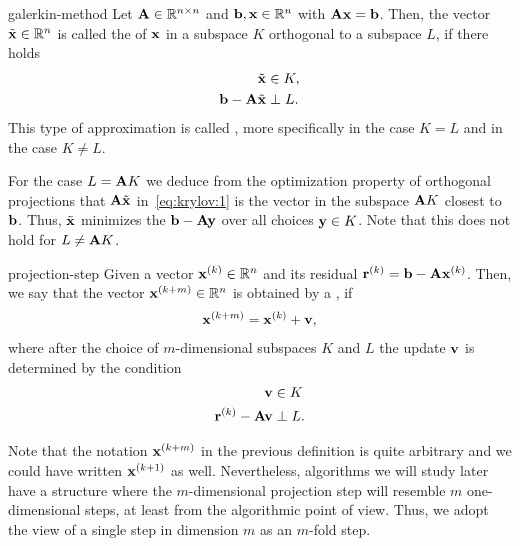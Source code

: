 \begin{Definition}{galerkin-method}
  Let $\mathbf A\in\mathbb R^{n\times n}$ and $\mathbf b, \mathbf x\in\mathbb R^n$ with $\mathbf A\mathbf x=\mathbf b$. Then,
  the vector $\tilde{\mathbf x}\in\mathbb R^n$ is called the  of $\mathbf x$ in a subspace $K$ orthogonal to a subspace
  $L$, if there holds
  \begin{align}
    \tilde{\mathbf x} &\in K,\\
    \mathbf b-\mathbf A\tilde{\mathbf x} &\perp L.
                         \label{eq:krylov:1}
  \end{align}
  This type of approximation is called , more
  specifically  in the case $K=L$ and
   in the case $K\neq L$.
\end{Definition}

\begin{remark}
  For the case $L=\mathbf A K$ we deduce from the optimization property of
  orthogonal projections that $\mathbf A\tilde {\mathbf x}$ in~\eqref{eq:krylov:1}
  is the vector in the subspace $\mathbf A K$ closest to $\mathbf b$. Thus,
  $\tilde{\mathbf x}$ minimizes the  $\mathbf b-\mathbf A\mathbf y$ over
  all choices $\mathbf y\in K$.
 Note that this does not hold for $L\neq \mathbf A K$.
\end{remark}

\begin{Definition}{projection-step}
  Given a vector $\mathbf x^{(k)}\in\mathbb R^n$ and its residual
  $\mathbf r^{(k)}=\mathbf b-\mathbf A\mathbf x^{(k)}$. Then, we say that the vector
  $\mathbf x^{(k+m)}\in\mathbb R^n$ is obtained by a , if
  \begin{gather}
    \mathbf x^{(k+m)} = \mathbf x^{(k)} + \mathbf v,
  \end{gather}
  where after the choice of $m$-dimensional subspaces $K$ and $L$ the update $\mathbf v$ is
  determined by the condition
  \begin{align}
    \mathbf v &\in K\\
    \mathbf r^{(k)} - \mathbf A\mathbf v &\perp L.
  \end{align}
\end{Definition}

Note that the notation $\mathbf x^{(k+m)}$ in the previous definition is
quite arbitrary and we could have written $\mathbf x^{(k+1)}$ as
well. Nevertheless, algorithms we will study later have a structure
where the $m$-dimensional projection step will resemble $m$
one-dimensional steps, at least from the algorithmic point of
view. Thus, we adopt the view of a single step in dimension $m$ as an
$m$-fold step.

